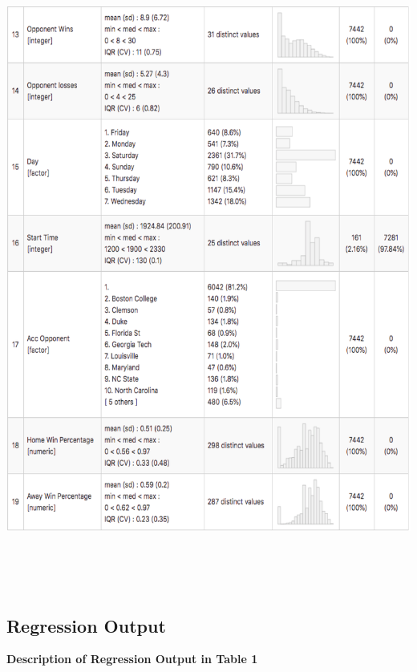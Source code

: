 \documentclass[preprint,12pt,times]{elsarticle}
\begin{document}
\includegraphics [width=\linewidth, height=21cm]{Picture9.png}
\newpage
\noindent

\begin{large}
\section{\textbf{Regression Output}}
\end{large}

\noindent
\begin{large}
\textbf{Description of Regression Output in Table 1}
\end{large}
\end{document}
